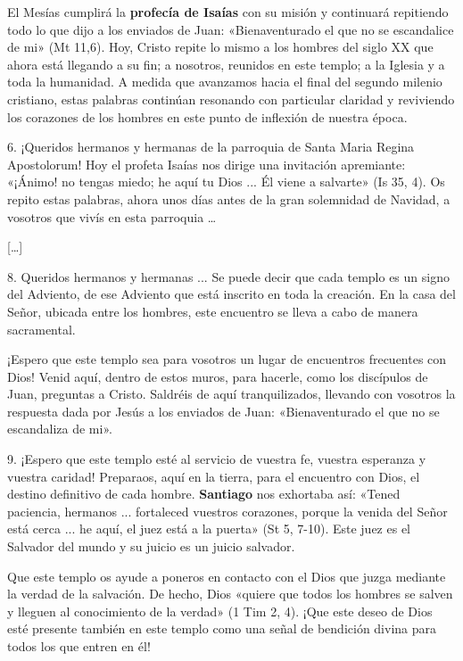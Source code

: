 \documentclass[]{article}
\begin{document}
El Mesías cumplirá la \textbf{profecía de Isaías} con su misión y
continuará repitiendo todo lo que dijo a los enviados de Juan:
«Bienaventurado el que no se escandalice de mi» (Mt 11,6). Hoy, Cristo
repite lo mismo a los hombres del siglo XX que ahora está llegando a su
fin; a nosotros, reunidos en este templo; a la Iglesia y a toda la
humanidad. A medida que avanzamos hacia el final del segundo milenio
cristiano, estas palabras continúan resonando con particular claridad y
reviviendo los corazones de los hombres en este punto de inflexión de
nuestra época.

6. ¡Queridos hermanos y hermanas de la parroquia de Santa Maria Regina
Apostolorum! Hoy el profeta Isaías nos dirige una invitación apremiante:
«¡Ánimo! no tengas miedo; he aquí tu Dios ... Él viene a salvarte» (Is
35, 4). Os repito estas palabras, ahora unos días antes de la gran
solemnidad de Navidad, a vosotros que vivís en esta parroquia \ldots{}

{[}\ldots{}{]}

8. Queridos hermanos y hermanas ... Se puede decir que cada templo es un
signo del Adviento, de ese Adviento que está inscrito en toda la
creación. En la casa del Señor, ubicada entre los hombres, este
encuentro se lleva a cabo de manera sacramental.

¡Espero que este templo sea para vosotros un lugar de encuentros
frecuentes con Dios! Venid aquí, dentro de estos muros, para hacerle,
como los discípulos de Juan, preguntas a Cristo. Saldréis de aquí
tranquilizados, llevando con vosotros la respuesta dada por Jesús a los
enviados de Juan: «Bienaventurado el que no se escandaliza de mi».

9. ¡Espero que este templo esté al servicio de vuestra fe, vuestra
esperanza y vuestra caridad! Preparaos, aquí en la tierra, para el
encuentro con Dios, el destino definitivo de cada hombre.
\textbf{Santiago} nos exhortaba así: «Tened paciencia, hermanos ...
fortaleced vuestros corazones, porque la venida del Señor está cerca ...
he aquí, el juez está a la puerta» (St 5, 7-10). Este juez es el
Salvador del mundo y su juicio es un juicio salvador.

Que este templo os ayude a poneros en contacto con el Dios que juzga
mediante la verdad de la salvación. De hecho, Dios «quiere que todos los
hombres se salven y lleguen al conocimiento de la verdad» (1 Tim 2, 4).
¡Que este deseo de Dios esté presente también en este templo como una
señal de bendición divina para todos los que entren en él!
\end{document}
